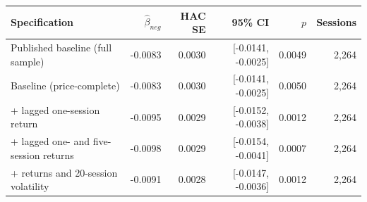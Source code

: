 \begin{tabular}{lrrrrr}
\toprule
Specification & $\hat\beta_{neg}$ & HAC SE & 95\% CI & $p$ & Sessions \\
\midrule
Published baseline (full sample) & -0.0083 & 0.0030 & [-0.0141, -0.0025] & 0.0049 & 2,264 \\
Baseline (price-complete) & -0.0083 & 0.0030 & [-0.0141, -0.0025] & 0.0050 & 2,264 \\
+ lagged one-session return & -0.0095 & 0.0029 & [-0.0152, -0.0038] & 0.0012 & 2,264 \\
+ lagged one- and five-session returns & -0.0098 & 0.0029 & [-0.0154, -0.0041] & 0.0007 & 2,264 \\
+ returns and 20-session volatility & -0.0091 & 0.0028 & [-0.0147, -0.0036] & 0.0012 & 2,264 \\
\bottomrule
\end{tabular}
